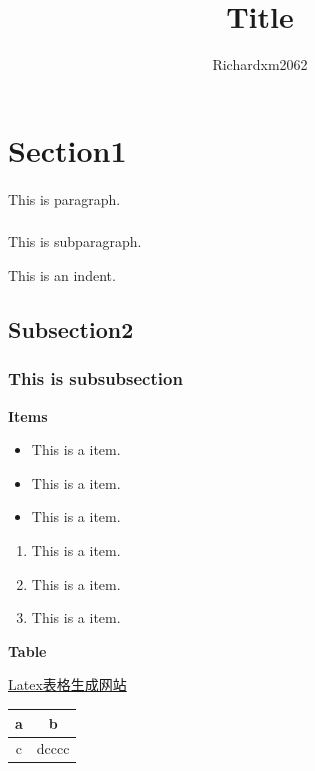 \documentclass{article}
\title{Title}
\author{Richardxm2062}
\begin{document}
 
    \maketitle
    \tableofcontents
    \newpage 

    \section{Section1} 

    \paragraph{} This is paragraph.  

            \subparagraph{} This is subparagraph.

    \indent This is an indent.

    \subsection{Subsection2}  

    \subsubsection{This is subsubsection} 

    \textbf{Items}   
    
    \begin{itemize} %
        \item This is a item. 
        \item This is a item.
        \item This is a item.
    \end{itemize}

    \begin{enumerate}   %
        \item This is a item.
        \item This is a item.
        \item This is a item.
    \end{enumerate} 


    \textbf{Table} 


    \href{tablegenerator.com}{Latex表格生成网站}    %


    \begin{tabular}{|c|c|} 
        \hline 
        a & b \\ 
        \hline 
        c & dcccc\\ 
        \hline 
    \end{tabular} 
\\
\\
\end{document}
